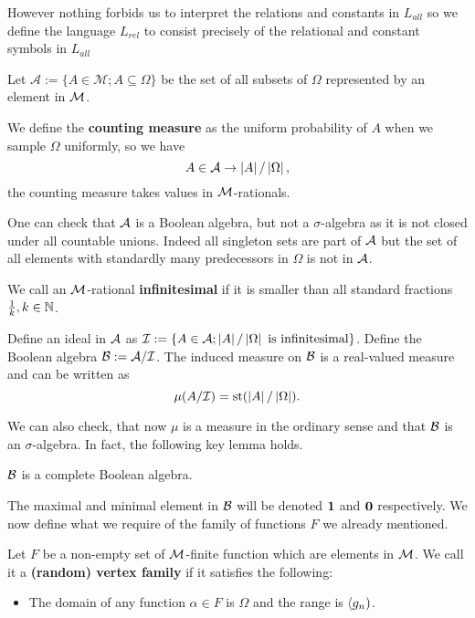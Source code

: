 However nothing forbids us to interpret the relations and constants in $L_{all}$ so we define the language $L_{rel}$ to consist precisely of the relational and constant symbols in $L_{all}$

\begin{defi}
Let $\mathcal{A}:=\{A\in\mathcal{M};A\subseteq \Omega\}$ be the set of all subsets of $\Omega$ represented by an element in $\mathcal{M}$.

We define the \textbf{counting measure} as the uniform probability of $A$ when we sample $\Omega$ uniformly, so we have
\[A\in\mathcal{A} \to \left|{A}\right|/\left|{\Omega}\right|,\]
the counting measure takes values in $\mathcal{M}$-rationals.
\end{defi}

One can check that $\mathcal{A}$ is a Boolean algebra, but not a $\sigma$-algebra as it is not closed under all countable unions. Indeed all singleton sets are part of $\mathcal{A}$ but the set of all elements with standardly many predecessors in $\Omega$ is not in $\mathcal{A}$.

\begin{defi}\label{defiinfinitesimal}
We call an $\mathcal{M}$-rational \textbf{infinitesimal} if it is smaller than all standard fractions $\frac{1}{k},k\in\mathbb{N}$.

Define an ideal in $\mathcal{A}$ as $\mathcal{I}:=\{A\in\mathcal{A};\left|{A}\right|/\left|{\Omega}\right|\text{ is infinitesimal}\}$. Define the Boolean algebra $\mathcal{B}:=\mathcal{A}/\mathcal{I}$. The induced measure on $\mathcal{B}$ is a real-valued measure and can be written as \[\mu(A/\mathcal{I})=\text{st}(\left|{A}\right|/\left|{\Omega}\right|).\]
\end{defi}

We can also check, that now $\mu$ is a measure in the ordinary sense and that $\mathcal{B}$ is an $\sigma$-algebra. In fact, the following key lemma holds.

\begin{lemm}
$\mathcal{B}$ is a complete Boolean algebra.
\end{lemm}

The maximal and minimal element in $\mathcal{B}$ will be denoted $\textbf{1}$ and $\textbf{0}$ respectively. We now define what we require of the family of functions $F$ we already mentioned.

\begin{defi}
Let $F$ be a non-empty set of $\mathcal{M}$-finite function which are elements in $\mathcal{M}$. We call it a \textbf{(random) vertex family} if it satisfies the following:
\begin{itemize}
\item The domain of any function $\alpha\in F$ is $\Omega$ and the range is $\langle g_n)$.
\end{itemize}
\end{defi}


